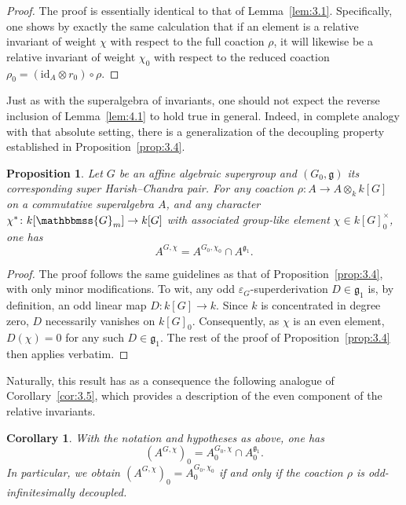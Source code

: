 \documentclass[11pt,a4paper,reqno,noamsfonts]{amsart}
\numberwithin{equation}{section}
\newtheorem{proposition}[theorem]{Proposition}
\newtheorem{corollary}[theorem]{Corollary}
\theoremstyle{definition}
\theoremstyle{remark}
\newcommand{\GG}{\ensuremath{\mathbbmss{G}}}
\newcommand{\gfrak}{\ensuremath{\mathfrak{g}}}
\begin{document}
\begin{proof}
The proof is essentially identical to that of Lemma~\ref{lem:3.1}. Specifically, one shows by exactly the same calculation that if an element is a relative invariant of weight $\chi$ with respect to the full coaction $\rho$, it will likewise be a relative invariant of weight $\chi_0$ with respect to the reduced coaction $\rho_0 = (\text{id}_A \otimes r_0) \circ \rho$.
\end{proof}

Just as with the superalgebra of invariants, one should not expect the reverse inclusion of Lemma~\ref{lem:4.1} to hold true in general. Indeed, in complete analogy with that absolute setting, there is a generalization of the decoupling property established in Proposition~\ref{prop:3.4}.

\begin{proposition}\label{prop:4.2}
Let $G$ be an affine algebraic supergroup and $(G_0,\gfrak)$ its corresponding super Harish--Chandra pair. For any coaction $\rho \colon A \to A \otimes_k k[G]$ on a commutative superalgebra $A$, and any character $\chi^{*} \colon k[\GG_m] \to k[G]$ with associated group-like element $\chi \in k[G]_0^{\times}$, one has 
\begin{equation}
A^{G,\chi } = A^{G_0,\chi_0} \cap A^{\gfrak_1}. 
\end{equation}
\end{proposition}

\begin{proof}
The proof follows the same guidelines as that of Proposition~\ref{prop:3.4}, with only minor modifications. To wit, any odd $\varepsilon_G$-superderivation $D \in \gfrak_1$ is, by definition, an odd linear map $D \colon k[G] \to k$. Since $k$ is concentrated in degree zero, $D$ necessarily vanishes on $k[G]_0$. Consequently, as $\chi$ is an even element, $D(\chi) = 0$ for any such $D \in \gfrak_1$. The rest of the proof of Proposition~\ref{prop:3.4} then applies verbatim.
\end{proof}

Naturally, this result has as a consequence the following analogue of Corollary~\ref{cor:3.5}, which provides a description of the even component of the relative invariants.

\begin{corollary}\label{cor:4.3}
With the notation and hypotheses as above, one has
\begin{equation}
(A^{G,\chi})_0 = A_0^{G_0,\chi} \cap A_0^{\gfrak_1}.
\end{equation}
In particular, we obtain $(A^{G,\chi})_0 = A_0^{G_0,\chi_0}$ if and only if the coaction $\rho$ is odd-infinitesimally decoupled.
\end{corollary}
\end{document}
